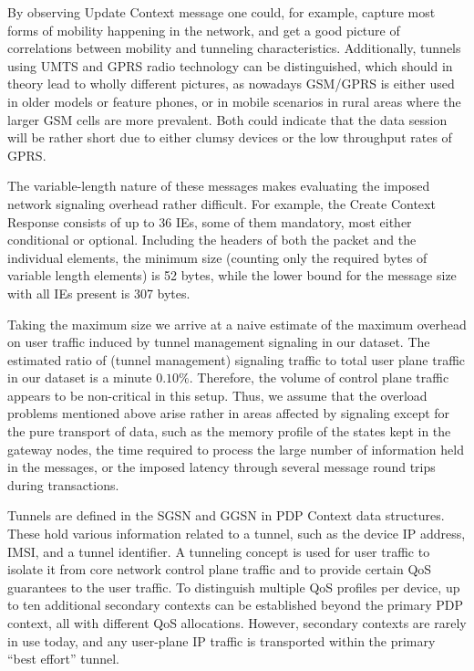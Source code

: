\begin{itemize}
By observing Update Context message one could, for example, capture most forms of mobility happening in the network, and get a good picture of correlations between mobility and tunneling characteristics. Additionally, tunnels using \gls{UMTS} and \gls{GPRS} radio technology can be distinguished, which should in theory lead to wholly different pictures, as nowadays GSM/GPRS is either used in older models or feature phones, or in mobile scenarios in rural areas where the larger GSM cells are more prevalent. Both could indicate that the data session will be rather short  due to either clumsy devices or the low throughput rates of \gls{GPRS}.
\end{itemize}

The variable-length nature of these messages makes evaluating the imposed network signaling overhead rather difficult. For example, the Create Context Response consists of up to 36 \glspl{IE}, some of them mandatory, most either conditional or optional. Including the headers of both the packet and the individual elements, the minimum size (counting only the required bytes of variable length elements) is 52 bytes, while the lower bound for the message size with all \glspl{IE} present is 307 bytes.

Taking the maximum size we arrive at a naive estimate of the maximum overhead on user traffic induced by tunnel management signaling in our dataset. The estimated ratio of (tunnel management) signaling traffic to total user plane traffic in our dataset is a minute $0.10\%$. Therefore, the volume of control plane traffic appears to be non-critical in this setup. Thus, we assume that the overload problems mentioned above arise rather in areas affected by signaling except for the pure transport of data, such as the memory profile of the states kept in the gateway nodes, the time required to process the large number of information held in the messages, or the imposed latency through several message round trips during transactions.


Tunnels are defined in the \gls{SGSN} and \gls{GGSN} in \gls{PDP} Context data structures. These hold various information related to a tunnel, such as the device IP address, \gls{IMSI}, and a tunnel identifier. A tunneling concept is used for user traffic to isolate it from core network control plane traffic and to provide certain \gls{QoS} guarantees to the user traffic. To distinguish multiple \gls{QoS} profiles per device, up to ten additional secondary contexts can be established beyond the primary PDP context, all with different \gls{QoS} allocations. However, secondary contexts are rarely in use today, and any user-plane IP traffic is transported within the primary ``best effort'' tunnel.

